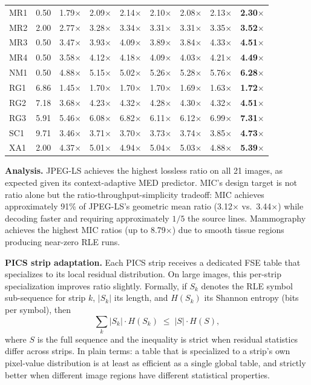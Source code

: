 \documentclass[journal]{IEEEtran}
\begin{document}
\begin{table}[t]
\begin{tabular}{lrrrrrrrr}
MR1  & 0.50 & 1.79$\times$ & 2.09$\times$ & 2.14$\times$ & 2.10$\times$ & 2.08$\times$ & 2.13$\times$ & \textbf{2.30$\times$} \\
MR2  & 2.00 & 2.77$\times$ & 3.28$\times$ & 3.34$\times$ & 3.31$\times$ & 3.31$\times$ & 3.35$\times$ & \textbf{3.52$\times$} \\
MR3  & 0.50 & 3.47$\times$ & 3.93$\times$ & 4.09$\times$ & 3.89$\times$ & 3.84$\times$ & 4.33$\times$ & \textbf{4.51$\times$} \\
MR4  & 0.50 & 3.58$\times$ & 4.12$\times$ & 4.18$\times$ & 4.09$\times$ & 4.03$\times$ & 4.21$\times$ & \textbf{4.49$\times$} \\
NM1  & 0.50 & 4.88$\times$ & 5.15$\times$ & 5.02$\times$ & 5.26$\times$ & 5.28$\times$ & 5.76$\times$ & \textbf{6.28$\times$} \\
RG1  & 6.86 & 1.45$\times$ & 1.70$\times$ & 1.70$\times$ & 1.70$\times$ & 1.69$\times$ & 1.63$\times$ & \textbf{1.72$\times$} \\
RG2  & 7.18 & 3.68$\times$ & 4.23$\times$ & 4.32$\times$ & 4.28$\times$ & 4.30$\times$ & 4.32$\times$ & \textbf{4.51$\times$} \\
RG3  & 5.91 & 5.46$\times$ & 6.08$\times$ & 6.82$\times$ & 6.11$\times$ & 6.12$\times$ & 6.99$\times$ & \textbf{7.31$\times$} \\
SC1  & 9.71 & 3.46$\times$ & 3.71$\times$ & 3.70$\times$ & 3.73$\times$ & 3.74$\times$ & 3.85$\times$ & \textbf{4.73$\times$} \\
XA1  & 2.00 & 4.37$\times$ & 5.01$\times$ & 4.94$\times$ & 5.04$\times$ & 5.03$\times$ & 4.88$\times$ & \textbf{5.39$\times$} \\
\bottomrule
\end{tabular}
\end{table}


\textbf{Analysis.} JPEG-LS achieves the highest lossless ratio on all 21
images, as expected given its context-adaptive MED predictor. MIC's design
target is not ratio alone but the ratio-throughput-simplicity tradeoff: MIC
achieves approximately 91\% of JPEG-LS's geometric mean ratio
(3.12$\times$ vs.\ 3.44$\times$) while decoding faster and requiring
approximately $1/5$ the source lines. Mammography achieves the highest MIC
ratios (up to 8.79$\times$) due to smooth tissue regions producing near-zero
RLE runs.

\textbf{PICS strip adaptation.} Each PICS strip receives a dedicated FSE table
that specializes to its local residual distribution. On large images, this
per-strip specialization improves ratio slightly. Formally, if $S_k$ denotes
the RLE symbol sub-sequence for strip $k$, $|S_k|$ its length, and $H(S_k)$
its Shannon entropy (bits per symbol), then
\begin{equation}
  \sum_k |S_k| \cdot H(S_k) \;\leq\; |S| \cdot H(S),
\end{equation}
where $S$ is the full sequence and the inequality is strict when residual
statistics differ across strips. In plain terms: a table that is specialized
to a strip's own pixel-value distribution is at least as efficient as a single
global table, and strictly better when different image regions have different
statistical properties.
\end{document}
